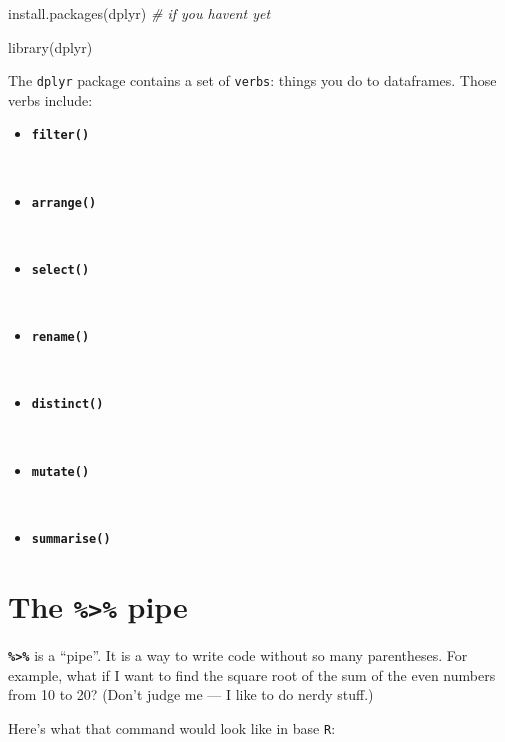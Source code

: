 \documentclass[
]{book}
\newenvironment{Shaded}{\begin{snugshade}}{\end{snugshade}}
\newcommand{\CommentTok}[1]{\textcolor[rgb]{0.56,0.35,0.01}{\textit{#1}}}
\newcommand{\FunctionTok}[1]{\textcolor[rgb]{0.00,0.00,0.00}{#1}}
\newcommand{\NormalTok}[1]{#1}
\newcommand{\StringTok}[1]{\textcolor[rgb]{0.31,0.60,0.02}{#1}}
\providecommand{\tightlist}{%
  \setlength{\itemsep}{0pt}\setlength{\parskip}{0pt}}
\begin{document}
\begin{Shaded}
\begin{Highlighting}[]
\FunctionTok{install.packages}\NormalTok{(}\StringTok{\textquotesingle{}dplyr\textquotesingle{}}\NormalTok{) }\CommentTok{\# if you haven\textquotesingle{}t yet}
\end{Highlighting}
\end{Shaded}

\begin{Shaded}
\begin{Highlighting}[]
\FunctionTok{library}\NormalTok{(dplyr)}
\end{Highlighting}
\end{Shaded}

The \texttt{dplyr} package contains a set of \texttt{verbs}: things you do to dataframes. Those verbs include:

\begin{itemize}
\tightlist
\item
  \textbf{\texttt{filter()}}\strut \\
\item
  \textbf{\texttt{arrange()}}\strut \\
\item
  \textbf{\texttt{select()}}\strut \\
\item
  \textbf{\texttt{rename()}}\strut \\
\item
  \textbf{\texttt{distinct()}}\strut \\
\item
  \textbf{\texttt{mutate()}}\strut \\
\item
  \textbf{\texttt{summarise()}}
\end{itemize}

\hypertarget{the-pipe}{%
\section*{\texorpdfstring{The \texttt{\%\textgreater{}\%} pipe}{The \%\textgreater\% pipe}}\label{the-pipe}}

\textbf{\texttt{\%\textgreater{}\%}} is a ``pipe''. It is a way to write code without so many parentheses. For example, what if I want to find the square root of the sum of the even numbers from 10 to 20? (Don't judge me --- I like to do nerdy stuff.)

Here's what that command would look like in base \texttt{R}:
\end{document}
